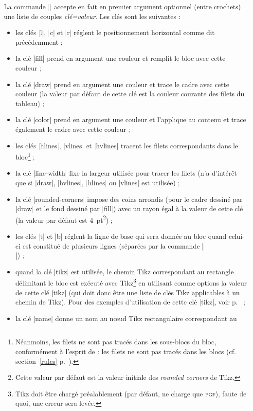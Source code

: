 \documentclass[dvipsnames]{article}%
\def\interitem{\vspace{7mm plus 2 mm minus 3mm}}
\begin{document}
\interitem
La commande |\Block| accepte en fait en premier argument optionnel (entre
crochets) une liste de couples \textsl{clé=valeur}. Les clés sont les suivantes :
\begin{itemize}
\item les clés |l|, |c| et |r| réglent le positionnement horizontal comme dit
précédemment ;
\item la clé |fill| prend en argument une couleur et remplit le bloc avec cette
couleur ;
\item la clé |draw| prend en argument une couleur et trace le cadre avec cette
couleur (la valeur par défaut de cette clé est la couleur courante des filets du
tableau) ;
\item la clé |color| prend en argument une couleur et l'applique au contenu et
trace également le cadre avec cette couleur ;
\item les clés |hlines|, |vlines| et |hvlines| tracent les filets correspondants
dans le bloc\footnote{Néanmoins, les filets ne sont pas tracés dans les
  sous-blocs du bloc, conformément à l'esprit de : les filets ne
sont pas tracés dans les blocs (cf. section~\ref{rules} p.~\pageref{rules}).} ;
\item la clé |line-width| fixe la largeur utilisée pour tracer les filets (n'a
d'intérêt que si |draw|, |hvlines|, |hlines| ou |vlines| est utilisée) ;
\item la clé |rounded-corners| impose des coins arrondis (pour le cadre dessiné
par |draw| et le fond dessiné par |fill|) avec un rayon égal à la valeur de
cette clé (la valeur par défaut est 4~pt\footnote{Cette valeur par défaut est la
  valeur initiale des \emph{rounded corners} de Tikz.}) ;
\item les clés |t| et |b| réglent la ligne de base qui sera donnée au bloc quand
celui-ci est constitué de plusieurs lignes (séparées par la commande |\\|) ;
\item quand la clé |tikz| est utilisée, le chemin Tikz correspondant au
rectangle délimitant le bloc est exécuté avec Tikz\footnote{Tikz doit être
  chargé préalablement (par défaut,  ne charge que
  \textsc{pgf}), faute de quoi, une erreur sera levée.} en utilisant comme
options la valeur de cette clé |tikz| (qui doit donc être une liste de clés Tikz
applicables à un chemin de Tikz). Pour des exemples d'utilisation de cette clé
|tikz|, voir p.~\pageref{tikz-key-examples} ;
\item la clé |name| donne un nom au nœud Tikz rectangulaire correspondant au

\end{itemize}
\end{document}
